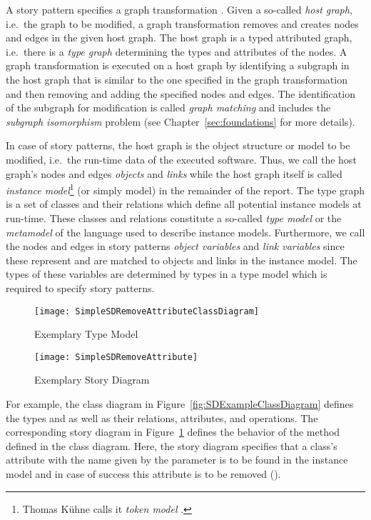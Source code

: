 A story pattern specifies a graph transformation \cite{Roz97}.
Given a so-called \emph{host graph}, i.e.\ the graph to be modified, a graph transformation removes and creates nodes and edges in the given host graph.
The host graph is a typed attributed graph, i.e.\ there is a \emph{type graph} determining the types and attributes of the nodes.
A graph transformation is executed on a host graph by identifying a subgraph in the host graph that is similar to the one specified in the graph transformation
and then removing and adding the specified nodes and edges.
The identification of the subgraph for modification is called \emph{graph matching} and includes the \emph{subgraph isomorphism} problem
(see Chapter~\ref{sec:foundations} for more details).

In case of story patterns, the host graph is the object structure or model to be modified, i.e.\ the run-time data of the executed software.
Thus, we call the host graph's nodes and edges \emph{objects} and \emph{links}
while the host graph itself is called \emph{instance model}\footnote{Thomas K\"{u}hne calls it \emph{token model} \cite{Kue06}.} (or simply model) in the remainder of the report.
The type graph is a set of classes and their relations which define all potential instance models at run-time.
These classes and relations constitute a so-called \emph{type model} or the \emph{metamodel} \cite{Kue06} of the language used to describe instance models.
Furthermore, we call the nodes and edges in story patterns \emph{object variables} and \emph{link variables}
since these represent and are matched to objects and links in the instance model.
The types of these variables are determined by types in a type model which is required to specify story patterns.

\begin{figure}[htb]
	\centering
  \begin{minipage}[t]{.4\textwidth}
    \centering
    \texttt{[image: SimpleSDRemoveAttributeClassDiagram]} 
    \caption{Exemplary Type Model}
    \label{fig:SDExampleClassDiagram}
  \end{minipage}%
  \hfill
  \begin{minipage}[t]{.55\textwidth}
    \centering
    \texttt{[image: SimpleSDRemoveAttribute]}
    \caption{Exemplary Story Diagram}
    \label{fig:SDExampleStoryDiagram}
  \end{minipage}
\end{figure}

For example, the class diagram in Figure~\ref{fig:SDExampleClassDiagram} defines the types  and  as well as their relations, attributes, and operations.
The corresponding story diagram in Figure~\ref{fig:SDExampleStoryDiagram} defines the behavior of the  method defined in the class diagram.
Here, the story diagram specifies that a class's attribute with the name given by the parameter  is to be found in the instance model and in case of success this attribute is to be removed (\destroy).

